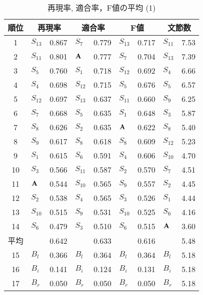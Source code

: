 \begin{table}[!htbp]
\begin{center}
\label{table:F-measure1}
\caption{再現率, 適合率，F値の平均 (1)}
\vspace{2mm}
\begin{tabular}{c|p{1.3mm}l|p{1.3mm}l|p{1.3mm}l|p{1.3mm}l}
\hline
順位 & \multicolumn{2}{c|}{再現率} & \multicolumn{2}{c|}{適合率} & 
 \multicolumn{2}{c|}{F値} & \multicolumn{2}{c}{文節数} \\
\hline
1  & $S_{13}$ & 0.867 & $S_{7}$  & 0.779 & $S_{13}$ & 0.717 & $S_{11}$ & 7.53  \\
2  & $S_{11}$ & 0.801 & $\bf{A}$ & 0.777 & $S_{7}$  & 0.704 & $S_{13}$ & 7.39  \\ 
3  & $S_{5}$  & 0.760 & $S_{1}$  & 0.718 & $S_{12}$ & 0.692 & $S_{4}$  & 6.66  \\
4  & $S_{4}$  & 0.698 & $S_{12}$ & 0.715 & $S_{5}$  & 0.676 & $S_{5}$  & 6.57  \\
5  & $S_{12}$ & 0.697 & $S_{13}$ & 0.637 & $S_{11}$ & 0.660 & $S_{9}$  & 6.25  \\
6  & $S_{7}$  & 0.668 & $S_{5}$  & 0.635 & $S_{1}$  & 0.648 & $S_{3}$  & 5.87  \\
7  & $S_{8}$  & 0.626 & $S_{2}$  & 0.635 & $\bf{A}$ & 0.622 & $S_{8}$  & 5.40  \\
8  & $S_{9}$  & 0.617 & $S_{8}$  & 0.618 & $S_{8}$  & 0.609 & $S_{12}$ & 5.23  \\
9  & $S_{1}$  & 0.615 & $S_{6}$  & 0.591 & $S_{4}$  & 0.606 & $S_{10}$ & 4.70  \\
10 & $S_{3}$  & 0.566 & $S_{11}$ & 0.587 & $S_{2}$  & 0.570 & $S_{7}$  & 4.51  \\
11 & $\bf{A}$ & 0.544 & $S_{10}$ & 0.565 & $S_{9}$  & 0.557 & $S_{2}$  & 4.45  \\
12 & $S_{2}$  & 0.538 & $S_{4}$  & 0.565 & $S_{3}$  & 0.526 & $S_{1}$  & 4.44  \\
13 & $S_{10}$ & 0.515 & $S_{9}$  & 0.531 & $S_{10}$ & 0.525 & $S_{6}$  & 4.16  \\
14 & $S_{6}$  & 0.479 & $S_{3}$  & 0.510 & $S_{6}$  & 0.515 & $\bf{A}$ & 3.60  \\
\hline
{\footnotesize 平均} & & 0.642 & & 0.633 & & 0.616 & & 5.48 \\
\hline
15 & $B_{l}$ & 0.366 & $B_{l}$ & 0.364 & $B_{l}$ & 0.364 & $B_{l}$ & 5.18 \\
16 & $B_{i}$ & 0.141 & $B_{i}$ & 0.124 & $B_{i}$ & 0.131 & $B_{i}$ & 5.18 \\
17 & $B_{r}$ & 0.050 & $B_{r}$ & 0.050 & $B_{r}$ & 0.050 & $B_{r}$ & 5.18 \\
\hline
\end{tabular}
\end{center}
\end{table}

